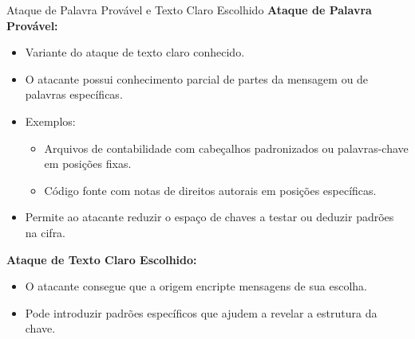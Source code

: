 \begin{frame}{Ataque de Palavra Provável e Texto Claro Escolhido}
    \textbf{Ataque de Palavra Provável:}
    \begin{itemize}
        \item Variante do ataque de texto claro conhecido.
        \item O atacante possui conhecimento parcial de partes da mensagem ou de palavras específicas.
        \item Exemplos:
              \begin{itemize}
                  \item Arquivos de contabilidade com cabeçalhos padronizados ou palavras-chave em posições fixas.
                  \item Código fonte com notas de direitos autorais em posições específicas.
              \end{itemize}
        \item Permite ao atacante reduzir o espaço de chaves a testar ou deduzir padrões na cifra.
    \end{itemize}

    \textbf{Ataque de Texto Claro Escolhido:}
    \begin{itemize}
        \item O atacante consegue que a origem encripte mensagens de sua escolha.
        \item Pode introduzir padrões específicos que ajudem a revelar a estrutura da chave.

    \end{itemize}
\end{frame}

